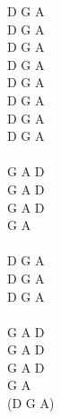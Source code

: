 \documentclass[a5paper, 10pt]{book}
\begin{document}
\begin{minipage}[t]{0.3\textwidth}
D G A   \\ %
D G A \\
D G A \\
D G A \\
D G A \\
D G A \\
D G A \\
D G A \\
\\
G A D \\
G A D \\
G A D \\
G A \\
\\
D G A \\
D G A \\
D G A \\
\\
G A D \\
G A D \\
G A D \\
G A \\
(D G A) \\

\end{minipage}

\newpage
\end{document}

